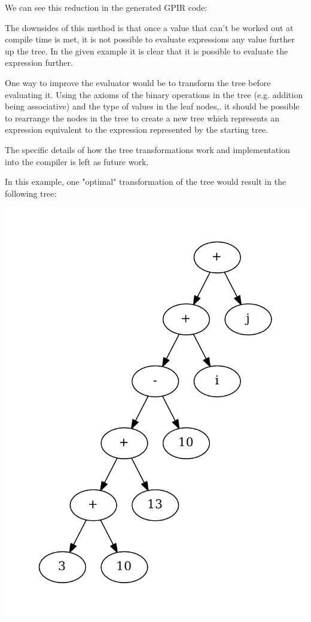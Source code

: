 We can see this reduction in the generated GPIR code:



The downsides of this method is that once
a value that can't be worked out at compile time is met, it is not possible
to evaluate expressions any value further up the tree. In the given example
it is clear that it is possible to evaluate the expression further.

One way to improve the evaluator would be to transform the tree before evaluating it.
Using the axioms of the binary operations in the tree (e.g. addition being associative)
and the type of values in the leaf nodes,. it should be possible to rearrange the nodes in the 
tree to create a new tree which represents an expression equivalent to the expression
represented by the starting tree.

The specific details of how the tree transformations work and implementation into the compiler is 
left as future work.

In this example, one "optimal" transformation of the tree would result in the following tree:

\begin{center}
\includegraphics[scale=0.5]{graphs/optimalEvalTree.pdf}
\end{center}

